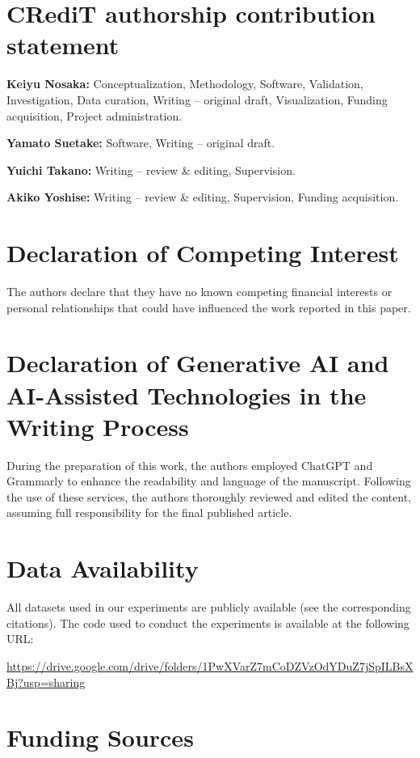 \documentclass[final,3p,times]{elsarticle}
\theoremstyle{plain}
\begin{document}
\section*{CRediT authorship contribution statement}
\label{CRediT}

\textbf{Keiyu Nosaka:} Conceptualization, Methodology, Software, Validation, Investigation, Data curation, Writing – original draft, Visualization, Funding acquisition, Project administration. 

\textbf{Yamato Suetake:} Software, Writing – original draft.

\textbf{Yuichi Takano:} Writing – review \& editing, Supervision.

\textbf{Akiko Yoshise:} Writing – review \& editing, Supervision, Funding acquisition. 


\section*{Declaration of Competing Interest}
\label{Interest}

The authors declare that they have no known competing financial interests or personal relationships that could have influenced the work reported in this paper.

\section*{Declaration of Generative AI and AI-Assisted Technologies in the Writing Process}
\label{GenerativeAI}

During the preparation of this work, the authors employed ChatGPT and Grammarly to enhance the readability and language of the manuscript. Following the use of these services, the authors thoroughly reviewed and edited the content, assuming full responsibility for the final published article.


\section*{Data Availability}
All datasets used in our experiments are publicly available (see the corresponding citations). The code used to conduct the experiments is available at the following URL:

\url{https://drive.google.com/drive/folders/1PwXVarZ7mCoDZVzOdYDuZ7jSpILBsXBj?usp=sharing}

\section*{Funding Sources}
\end{document}
